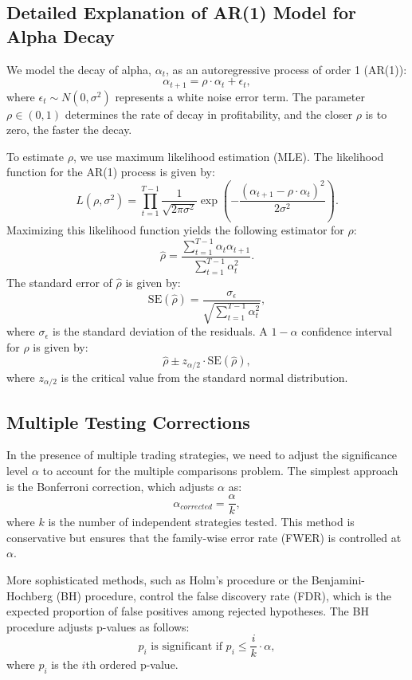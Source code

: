 \subsection{Detailed Explanation of AR(1) Model for Alpha Decay}

We model the decay of alpha, $\alpha_t$, as an autoregressive process of order 1 (AR(1)):
\[
\alpha_{t+1} = \rho \cdot \alpha_t + \epsilon_t,
\]
where $\epsilon_t \sim N(0, \sigma^2)$ represents a white noise error term. The parameter $\rho \in (0, 1)$ determines the rate of decay in profitability, and the closer $\rho$ is to zero, the faster the decay.

To estimate $\rho$, we use maximum likelihood estimation (MLE). The likelihood function for the AR(1) process is given by:
\[
L(\rho, \sigma^2) = \prod_{t=1}^{T-1} \frac{1}{\sqrt{2\pi\sigma^2}} \exp\left( -\frac{(\alpha_{t+1} - \rho \cdot \alpha_t)^2}{2\sigma^2} \right).
\]
Maximizing this likelihood function yields the following estimator for $\rho$:
\[
\hat{\rho} = \frac{\sum_{t=1}^{T-1} \alpha_t \alpha_{t+1}}{\sum_{t=1}^{T-1} \alpha_t^2}.
\]
The standard error of $\hat{\rho}$ is given by:
\[
\text{SE}(\hat{\rho}) = \frac{\sigma_{\epsilon}}{\sqrt{\sum_{t=1}^{T-1} \alpha_t^2}},
\]
where $\sigma_{\epsilon}$ is the standard deviation of the residuals. A $1-\alpha$ confidence interval for $\rho$ is given by:
\[
\hat{\rho} \pm z_{\alpha/2} \cdot \text{SE}(\hat{\rho}),
\]
where $z_{\alpha/2}$ is the critical value from the standard normal distribution.

\subsection{Multiple Testing Corrections}

In the presence of multiple trading strategies, we need to adjust the significance level $\alpha$ to account for the multiple comparisons problem. The simplest approach is the Bonferroni correction, which adjusts $\alpha$ as:
\[
\alpha_{corrected} = \frac{\alpha}{k},
\]
where $k$ is the number of independent strategies tested. This method is conservative but ensures that the family-wise error rate (FWER) is controlled at $\alpha$.

More sophisticated methods, such as Holm's procedure or the Benjamini-Hochberg (BH) procedure, control the false discovery rate (FDR), which is the expected proportion of false positives among rejected hypotheses. The BH procedure adjusts p-values as follows:
\[
p_i \text{ is significant if } p_i \leq \frac{i}{k} \cdot \alpha,
\]
where $p_i$ is the $i$th ordered p-value.

